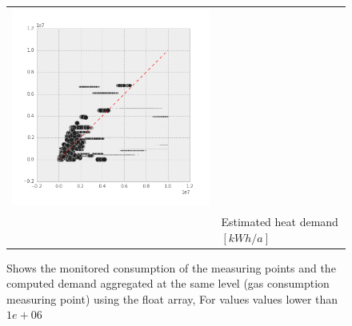\begin{figure}[htb]
\begin{tabular}{lccc}
 \includegraphics[width= 0.28\linewidth]{FIGURES/EcoFYS_07}\\
&\multicolumn{3}{l}{Estimated heat demand $[kWh/a]$}\\
 
\end{tabular}	
 	\caption[consumption vs. demand with flooat array]{
 	Shows the monitored consumption of the measuring points
 	and the computed demand aggregated at the same level (gas consumption measuring
 	point) using the float array,
 	For values values lower than $1e+06$}
     \label{fig:con_dem_W07}
\end{figure}

